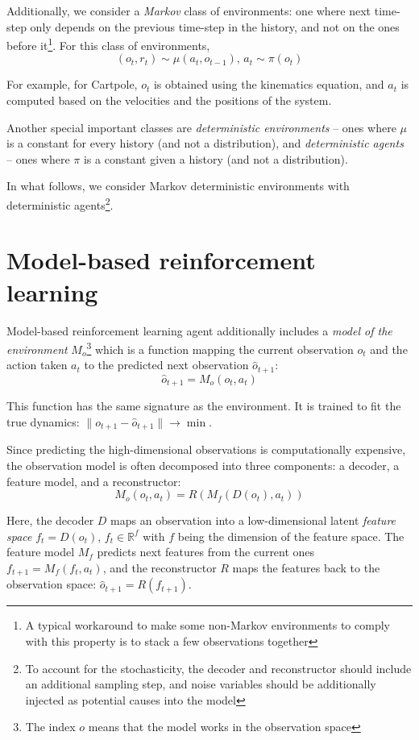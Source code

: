 \documentclass[a4paper,11pt,oneside]{report}
\begin{document}
Additionally, we consider a {\em Markov} class of environments: one where next time-step only depends on the previous time-step in the history, and not on the ones before it\footnote{A typical workaround to make some non-Markov environments to comply with this property is to stack a few observations together}. For this class of environments,
$$
(o_t, r_t)\sim \mu(a_t, o_{t-1}),\,a_t\sim\pi(o_t)
$$

For example, for Cartpole, $o_t$ is obtained using the kinematics equation, and $a_t$ is computed based on the velocities and the positions of the system.

Another special important classes are {\em deterministic environments} -- ones where $\mu$ is a constant for every history (and not a distribution), and {\em deterministic agents} -- ones where $\pi$ is a constant given a history (and not a distribution).

In what follows, we consider Markov deterministic environments with deterministic agents\footnote{To account for the stochasticity, the decoder and reconstructor should include an additional sampling step, and noise variables should be additionally injected as potential causes into the model}.


\section{Model-based reinforcement learning}
\label{sec:mbrl}
Model-based reinforcement learning agent additionally includes a {\em model of the environment} $M_o$\footnote{The index $o$ means that the model works in the observation space} which is a function mapping the current observation $o_t$ and the action taken $a_t$ to the predicted next observation $\hat{o}_{t+1}$:
$$
\hat{o}_{t+1}=M_o(o_t, a_t)
$$

This function has the same signature as the environment. It is trained to fit the true dynamics: $\|o_{t+1}-\hat{o}_{t+1}\|\to\min$.

Since predicting the high-dimensional observations is computationally expensive, the observation model is often decomposed into three components: a decoder, a feature model, and a reconstructor:
$$
M_o(o_t, a_t)=R(M_f(D(o_t), a_t))
$$

Here, the decoder $D$ maps an observation into a low-dimensional latent {\em feature space} $f_t=D(o_t)$, $f_t\in \mathbb R^f$ with $f$ being the dimension of the feature space. The feature model $M_f$ predicts next features from the current ones $f_{t+1}=M_f(f_t,a_t)$, and the reconstructor $R$ maps the features back to the observation space: $\hat{o}_{t+1}=R(f_{t+1})$.
\end{document}
